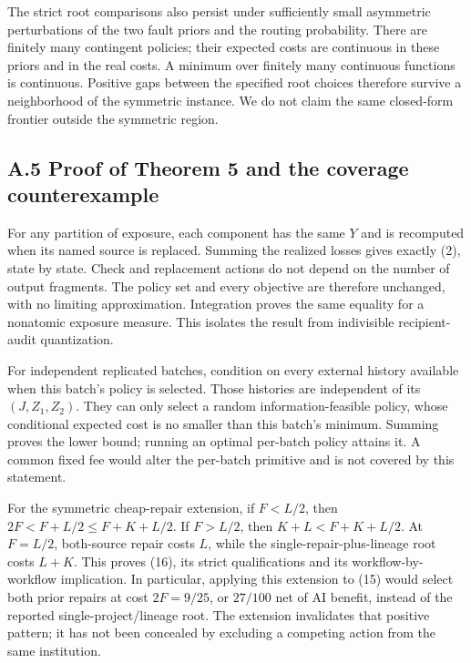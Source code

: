 \documentclass[
  11pt,
  a4paper,
]{article}
\begin{document}
The strict root comparisons also persist under sufficiently small
asymmetric perturbations of the two fault priors and the routing
probability. There are finitely many contingent policies; their expected
costs are continuous in these priors and in the real costs. A minimum
over finitely many continuous functions is continuous. Positive gaps
between the specified root choices therefore survive a neighborhood of
the symmetric instance. We do not claim the same closed-form frontier
outside the symmetric region.

\subsection{A.5 Proof of Theorem 5 and the coverage
counterexample}\label{a.5-proof-of-theorem-5-and-the-coverage-counterexample}

For any partition of exposure, each component has the same \(Y\) and is
recomputed when its named source is replaced. Summing the realized
losses gives exactly (2), state by state. Check and replacement actions
do not depend on the number of output fragments. The policy set and
every objective are therefore unchanged, with no limiting approximation.
Integration proves the same equality for a nonatomic exposure measure.
This isolates the result from indivisible recipient-audit quantization.

For independent replicated batches, condition on every external history
available when this batch's policy is selected. Those histories are
independent of its \((J,Z_1,Z_2)\). They can only select a random
information-feasible policy, whose conditional expected cost is no
smaller than this batch's minimum. Summing proves the lower bound;
running an optimal per-batch policy attains it. A common fixed fee would
alter the per-batch primitive and is not covered by this statement.

For the symmetric cheap-repair extension, if \(F<L/2\), then
\(2F<F+L/2\leq F+K+L/2\). If \(F>L/2\), then \(K+L<F+K+L/2\). At
\(F=L/2\), both-source repair costs \(L\), while the
single-repair-plus-lineage root costs \(L+K\). This proves (16), its
strict qualifications and its workflow-by-workflow implication. In
particular, applying this extension to (15) would select both prior
repairs at cost \(2F=9/25\), or \(27/100\) net of AI benefit, instead of
the reported single-project/lineage root. The extension invalidates that
positive pattern; it has not been concealed by excluding a competing
action from the same institution.
\end{document}

